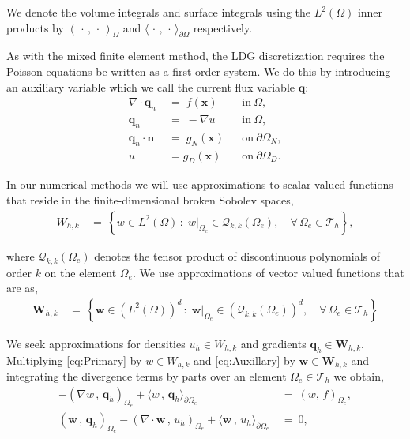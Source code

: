 \documentclass[10pt]{report}
\numberwithin{equation}{section}
\begin{document}
\noindent
We denote the volume integrals and surface integrals using the $L^{2}(\Omega)$ inner products by $( \, \cdot \, , \, \cdot \, )_{\Omega}$ and $\langle  \, \cdot \, , \, \cdot \,  \rangle_{\partial \Omega}$ respectively. 
\vspace{2mm}

As with the mixed finite element method, the LDG discretization requires the Poisson equations be written as a first-order system.  We do this by introducing an auxiliary variable which we call the current flux variable $\textbf{q}$:
\begin{align}
\label{eq:Primary}
\nabla \cdot \textbf{q}_{n}
\; &= \; 
f(\textbf{x}) && \text{in} \ \Omega,  \\
\label{eq:Auxillary}
\textbf{q}_{n} 
\; &= \;
 -\nabla u && \text{in} \ \Omega,   \\
\textbf{q}_{n}   \cdot \textbf{n} 
\; &= \; g_{N}(\textbf{x}) && \text{on} \ \partial \Omega_{N},\\
u &= g_{D}(\textbf{x}) && \mbox{on}\ \partial \Omega_{D}.
\end{align}

In our numerical methods we will use approximations to scalar valued functions that reside in the finite-dimensional broken Sobolev spaces,
\begin{align}
W_{h,k}
\, &= \, 
\left\{ w \in L^{2}(\Omega) \, : \; w  \vert_{\Omega_{e}} \in \mathcal{Q}_{k,k}(\Omega_{e}), \quad \forall \, \Omega_{e}  \in \mathcal{T}_{h}  \right\}, 
\end{align}

\noindent
where $\mathcal{Q}_{k,k}(\Omega_{e})$ denotes the tensor product of discontinuous polynomials of order $k$ on the element $\Omega_{e}$. We use approximations of vector valued functions that are as,
\begin{align}
\textbf{W}_{h,k} 
\, &= \, 
\left\{  \textbf{w}  \in \left(L^{2}(\Omega)\right)^{d} \, :
 \; \textbf{w}  \vert_{\Omega_{e}} \in \left( \mathcal{Q}_{k,k}(\Omega_{e}) \right)^{d}, \quad \forall \, \Omega_{e} \in  \mathcal{T}_{h} \right\}
\end{align}

\noindent
We seek approximations for densities $u_{h} \in W_{h,k}$ and gradients $\textbf{q}_{h}\in \textbf{W}_{h,k}$. Multiplying \eqref{eq:Primary} by $w \in W_{h,k}$ and \eqref{eq:Auxillary} by $\textbf{w} \in \textbf{W}_{h,k}$ and integrating the divergence terms by parts over an element $\Omega_{e} \in \mathcal{T}_{h}$ we obtain,
\begin{align}
-
\left( \nabla w  \, , \, \textbf{q}_{h}  \right)_{\Omega_{e}}
+
\langle w \, , \,  \textbf{q}_{h}  \rangle_{\partial \Omega_{e}} 
\ &= \
\left( w , \, f \right)_{\Omega_{e}} , \nonumber \\
\left( \textbf{w} \, , \, \textbf{q}_{h} \right)_{\Omega_{e}}
-
\left(  \nabla \cdot \textbf{w} \, , \,  u_{h} \right)_{\Omega_{e}}
+
\langle   \textbf{w}  \, ,   \, u_{h}
\rangle_{\partial \Omega_{e}} 
\ &= \
0 ,\nonumber
\end{align}
\end{document}
